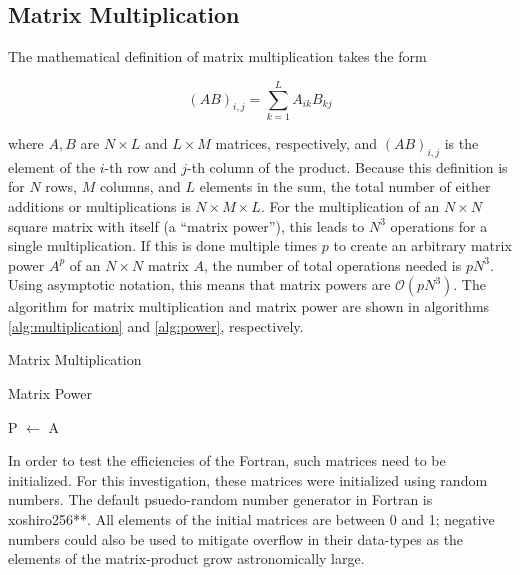 \documentclass{article}
\begin{document}
    \subsection{Matrix Multiplication}

        The mathematical definition of matrix multiplication takes the form

        \begin{equation} \label{eq:matrix_power}
            (A B)_{i,j} = \sum_{k = 1}^{L} A_{ik} B_{kj}
        \end{equation}

        where $A,B$ are $N \times L$ and $L \times M$ matrices, respectively, and $(A B)_{i,j}$ is the element of the $i$-th row and $j$-th column of the product.  Because this definition is for $N$ rows, $M$ columns, and $L$ elements in the sum, the total number of either additions or multiplications is $N \times M \times L$.  For the multiplication of an $N \times N$ square matrix with itself (a ``matrix power''), this leads to $N^3$ operations for a single multiplication.  If this is done multiple times $p$ to create an arbitrary matrix power $A^p$ of an $N \times N$ matrix $A$, the number of total operations needed is $p N^3$.  Using asymptotic notation, this means that matrix powers are $\mathcal{O}(p N^3)$.  The algorithm for matrix multiplication and matrix power are shown in algorithms \ref{alg:multiplication} and \ref{alg:power}, respectively.

        \begin{algorithm}
            \caption{Matrix Multiplication \label{alg:multiplication}}
        \end{algorithm}

        \begin{algorithm}
            \caption{Matrix Power \label{alg:power}}
            P $\gets$ A \;
        \end{algorithm}

        In order to test the efficiencies of the Fortran, such matrices need to be initialized.  For this investigation, these matrices were initialized using random numbers.  The default psuedo-random number generator in Fortran is xoshiro256**.  All elements of the initial matrices are between 0 and 1; negative numbers could also be used to mitigate overflow in their data-types as the elements of the matrix-product grow astronomically large.
\end{document}
